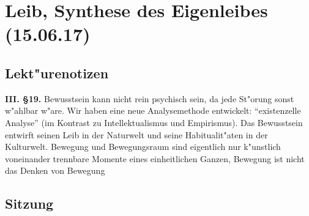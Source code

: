 \documentclass[emulatestandardclasses]{scrartcl}
\begin{document}
\section{Leib, Synthese des Eigenleibes\\(15.06.17)}

\subsection{Lekt"urenotizen}


\textbf{III. \S 19.} Bewusstsein kann nicht rein psychisch sein, da jede St"orung sonst w"ahlbar w"are. Wir haben eine neue Analysemethode entwickelt: "`existenzelle Analyse"' (im Kontrast zu Intellektualismus und Empirismus). Das Bewusstsein entwirft seinen Leib in der Naturwelt und seine Habitualit"aten in der Kulturwelt. Bewegung und Bewegungsraum sind eigentlich nur k"unstlich voneinander trennbare Momente eines einheitlichen Ganzen, Bewegung ist nicht das Denken von Bewegung

\subsection{Sitzung}
\end{document}
